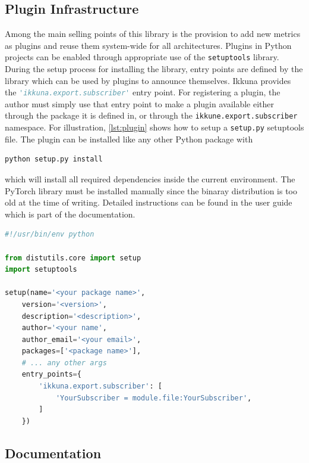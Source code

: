 \hypertarget{plugin-infrastructure}{%
\subsection{Plugin Infrastructure}\label{plugin-infrastructure}}

Among the main selling points of this library is the provision to add new
metrics as plugins and reuse them system-wide for all architectures. Plugins in
Python projects can be enabled through appropriate use of the
\texttt{setuptools} library. During the setup process for installing the
library, entry points are defined by the library which can be used by plugins to
announce themselves. Ikkuna provides the
\lstinline[language=Python,breaklines=false]{'ikkuna.export.subscriber'} entry
point. For registering a plugin, the author must simply use that entry point to
make a plugin available either through the package it is defined in, or through
the \lstinline{ikkune.export.subscriber} namespace. For illustration,
\cref{lst:plugin} shows how to setup a \texttt{setup.py} setuptools file. The
plugin can be installed like any other Python package with
\begin{lstlisting}[language=Python]
python setup.py install
\end{lstlisting}
which will install all required dependencies inside the current environment. The
PyTorch library must be installed manually since the binaray distribution is too
old at the time of writing. Detailed instructions can be found in the user guide
which is part of the documentation.

\begin{lstlisting}[label=lst:plugin, language=Python, caption=Sample setup script for subscriber plugins]
#!/usr/bin/env python

from distutils.core import setup
import setuptools

setup(name='<your package name>',
    version='<version>',
    description='<description>',
    author='<your name',
    author_email='<your email>',
    packages=['<package name>'],
    # ... any other args
    entry_points={
        'ikkuna.export.subscriber': [
            'YourSubscriber = module.file:YourSubscriber',
        ]
    })
\end{lstlisting}

\subsection{Documentation}\label{doc}

